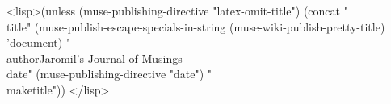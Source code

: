 \documentclass[final,a4paper,10pt,onecolumn,twoside]{memoir}
\begin{document}
<lisp>(unless (muse-publishing-directive "latex-omit-title")
(concat "\\title{" (muse-publish-escape-specials-in-string
  (muse-wiki-publish-pretty-title) 'document) "}
\\author{Jaromil's Journal of Musings}
\\date{" (muse-publishing-directive "date") "}
\\maketitle"))
</lisp>
\end{document}
